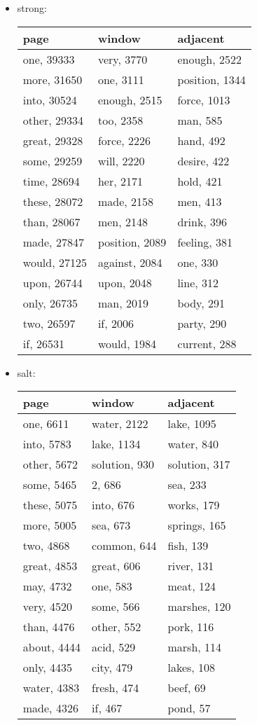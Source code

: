 \documentclass[12pt,letterpaper]{article}
\begin{document}
\begin{itemize}
\item strong: 
\\
\begin{tabular}{| p{5cm} | p{5cm} | p{5cm} |}
    \hline 
    page & window & adjacent \\ \hline
    one, 39333 & very, 3770 & enough, 2522 \\
    more, 31650 & one, 3111 & position, 1344 \\
    into, 30524 & enough, 2515 & force, 1013 \\
    other, 29334 & too, 2358 & man, 585 \\
    great, 29328 & force, 2226 & hand, 492 \\
    some, 29259 & will, 2220 & desire, 422 \\
    time, 28694 & her, 2171 & hold, 421 \\
    these, 28072 & made, 2158 & men, 413 \\
    than, 28067 & men, 2148 & drink, 396 \\
    made, 27847 & position, 2089 & feeling, 381 \\
    would, 27125 & against, 2084 & one, 330 \\
    upon, 26744 & upon, 2048 & line, 312 \\
    only, 26735 & man, 2019 & body, 291 \\
    two, 26597 & if, 2006 & party, 290 \\
    if, 26531 & would, 1984 & current, 288 \\
    \hline
\end{tabular}

\item salt:
\\
\begin{tabular}{| p{5cm} | p{5cm} | p{5cm} |}
    \hline 
    page & window & adjacent \\ \hline
    one, 6611 & water, 2122 & lake, 1095 \\
    into, 5783 & lake, 1134 & water, 840 \\
    other, 5672 & solution, 930 & solution, 317 \\
    some, 5465 & 2, 686 & sea, 233 \\
    these, 5075 & into, 676 & works, 179 \\
    more, 5005 & sea, 673 & springs, 165 \\
    two, 4868 & common, 644 & fish, 139 \\
    great, 4853 & great, 606 & river, 131 \\
    may, 4732 & one, 583 & meat, 124 \\
    very, 4520 & some, 566 & marshes, 120 \\
    than, 4476 & other, 552 & pork, 116 \\
    about, 4444 & acid, 529 & marsh, 114 \\
    only, 4435 & city, 479 & lakes, 108 \\
    water, 4383 & fresh, 474 & beef, 69 \\
    made, 4326 & if, 467 & pond, 57 \\
    \hline
\end{tabular}


\end{itemize}
\end{document}

